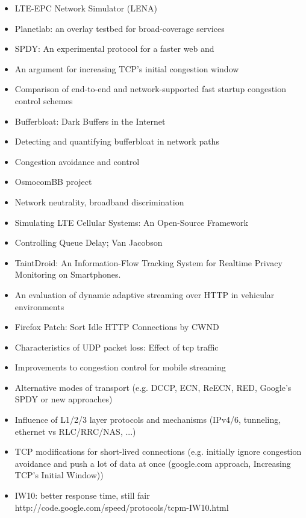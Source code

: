 \begin{itemize}
	\item \gls{LTE}-\gls{EPC} Network Simulator (LENA)\cite{ns3lte}
	\item Planetlab: an overlay testbed for broad-coverage services \cite{chun2003planetlab}
	\item SPDY: An experimental protocol for a faster web \cite{google2011SPDYdef} and \cite{google2010SPDYwp}
	\item An argument for increasing \gls{TCP}'s initial congestion window \cite{dukkipati2010argument}
	\item Comparison of end-to-end and network-supported fast startup congestion control schemes \cite{scharf2011comparison}
	\item Bufferbloat: Dark Buffers in the Internet \cite{gettys2011bufferbloat}
	\item Detecting and quantifying bufferbloat in network paths \cite{groenewegen2011detecting}
	\item Congestion avoidance and control \cite{jacobson1988congestion}
	\item OsmocomBB project \cite{osmocombbwww}
	\item Network neutrality, broadband discrimination \cite{wu2003network}
	\item Simulating LTE Cellular Systems: An Open-Source Framework \cite{5634134}
	\item Controlling Queue Delay; Van Jacobson \cite{Nichols:2012:CQD:2209249.2209264}
	\item TaintDroid: An Information-Flow Tracking System for Realtime Privacy Monitoring on Smartphones. \cite{enck2010taintdroid}
	\item An evaluation of dynamic adaptive streaming over \gls{HTTP} in vehicular environments \cite{Muller:2012:EDA:2151677.2151686}
	\item Firefox Patch: Sort Idle HTTP Connections by CWND \cite{ffSortCWND}
	\item Characteristics of UDP packet loss: Effect of tcp traffic \cite{sawashima97characteristics}

	\item Improvements to congestion control for mobile streaming
	\item Alternative modes of transport (e.g. DCCP, ECN, ReECN, RED, Google's SPDY or new approaches)
	\item Influence of L1/2/3 layer protocols and mechanisms (IPv4/6, tunneling, ethernet vs RLC/RRC/NAS, ...) %

	\item TCP modifications for short-lived connections (e.g. initially ignore congestion avoidance and push a lot of data at once (google.com approach, Increasing TCP's Initial Window)) 
	\item IW10: better response time, still fair  http://code.google.com/speed/protocols/tcpm-IW10.html

\end{itemize}


